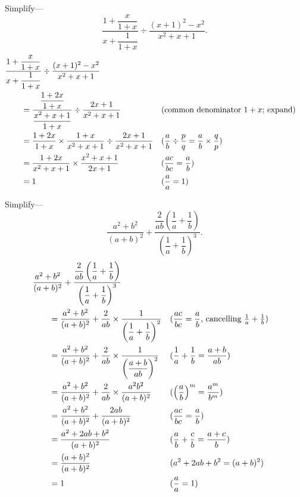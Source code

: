 \documentclass[DIN, pagenumber=false, fontsize=11pt, parskip=half]{scrartcl}
\begin{document}
\begin{problems}[from=1,step=1]
    \problem Simplify---
    \[
        \frac{1 + \dfrac{x}{1+x}}{x + \dfrac{1}{1+x}} \div \frac{(x+1)^2 - x^2}{x^2+x+1}.
    \]
    \answer 
    \begin{align*}
        \MoveEqLeft
        \frac{1 + \dfrac{x}{1+x}}{x + \dfrac{1}{1+x}} \div \frac{(x+1)^2 - x^2}{x^2+x+1}\\ 
        &= \frac{\dfrac{1+2x}{1+x}}{\dfrac{x^2+x+1}{1+x}} \div \frac{2x+1}{x^2+x+1} && \text{(common denominator $1+x$; expand)}\\ 
        &= \frac{1+2x}{1+x} \times \frac{1+x}{x^2+x+1} \div \frac{2x+1}{x^2+x+1} && \text{($\frac{a}{b} \div \frac{p}{q} = \frac{a}{b} \times \frac{q}{p}$)}\\ 
        &= \frac{1+2x}{x^2+x+1} \times \frac{x^2+x+1}{2x+1} && \text{($\frac{ac}{bc} = \frac{a}{b}$)}\\ 
        &= 1 && \text{($\frac{a}{a} = 1$)}
    \end{align*}

    \problem Simplify---
    \[
        \frac{a^2+b^2}{(a+b)^2} + \frac{\dfrac{2}{ab}\left(\dfrac{1}{a} + \dfrac{1}{b}\right)}{\left(\dfrac{1}{a} + \dfrac{1}{b}\right)^{3}}.
    \]
    \answer 
    \begin{align*}
        \MoveEqLeft
        \frac{a^2+b^2}{(a+b)^2} + \frac{\dfrac{2}{ab}\left(\dfrac{1}{a} + \dfrac{1}{b}\right)}{\left(\dfrac{1}{a} + \dfrac{1}{b}\right)^{3}}\\ 
        &= \frac{a^2+b^2}{(a+b)^2} + \frac{2}{ab} \times \frac{1}{\left(\dfrac{1}{a} + \dfrac{1}{b}\right)^{2}} && \text{($\frac{ac}{bc} = \frac{a}{b}$, cancelling $\tfrac{1}{a}+\tfrac{1}{b}$)}\\ 
        &= \frac{a^2+b^2}{(a+b)^2} + \frac{2}{ab} \times \frac{1}{\left(\dfrac{a+b}{ab}\right)^{2}} && \text{($\frac{1}{a} + \frac{1}{b} = \frac{a+b}{ab}$)}\\ 
        &= \frac{a^2+b^2}{(a+b)^2} + \frac{2}{ab} \times \frac{a^2b^2}{(a+b)^2} && \text{($\left(\frac{a}{b}\right)^m = \frac{a^m}{b^m}$)}\\ 
        &= \frac{a^2+b^2}{(a+b)^2} + \frac{2ab}{(a+b)^2} && \text{($\frac{ac}{bc} = \frac{a}{b}$)}\\ 
        &= \frac{a^2+2ab+b^2}{(a+b)^2} && \text{($\frac{a}{b} + \frac{c}{b} = \frac{a+c}{b}$)}\\ 
        &= \frac{(a+b)^2}{(a+b)^2} && \text{($a^2+2ab+b^2 = (a+b)^2$)}\\ 
        &= 1 && \text{($\frac{a}{a} = 1$)}
    \end{align*}


\end{problems}
\end{document}
